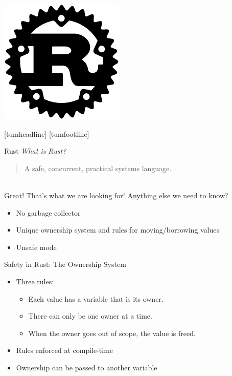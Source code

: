 \documentclass[NET,english,aspectratio=169,notitleframe]{tumbeamer}
\begin{document}
\begin{frame}{}
\centering\includegraphics[height=0.87\textheight]{pics/rust}
\end{frame}
[tumheadline]
[tumfootline]

\begin{frame}{Rust}
\emph{What is Rust?}\\
\begin{quote}
A safe, concurrent, practical systems language.
\end{quote}\\
Great! That's what we are looking for! Anything else we need to know?\\
\begin{itemize}
\item No garbage collector
\item Unique ownership system and rules for moving/borrowing values
\item Unsafe mode
\end{itemize}
\end{frame}

\begin{frame}{Safety in Rust: The Ownership System}
\begin{itemize}
\item Three rules:
\begin{itemize}
\item Each value has a variable that is its owner.
\item There can only be one owner at a time.
\item When the owner goes out of scope, the value is freed.
\end{itemize}
\item Rules enforced at compile-time
\item Ownership can be passed to another variable%
\end{itemize}
\end{frame}
\end{document}
